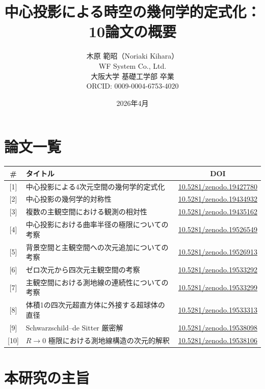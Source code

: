 \documentclass[12pt,a4paper]{ltjsarticle}
\title{中心投影による時空の幾何学的定式化：10論文の概要}
\author{木原 範昭（Noriaki Kihara）\\
WF System Co., Ltd.\\
大阪大学 基礎工学部 卒業\\
ORCID: 0009-0004-6753-4020}
\date{2026年4月}
\begin{document}
\maketitle

\section*{論文一覧}

\begin{table}[h]
\centering
\small
\begin{tabular}{clc}
\toprule
\# & タイトル & DOI \\
\midrule
{[1]} & 中心投影による4次元空間の幾何学的定式化 & \href{https://doi.org/10.5281/zenodo.19427780}{10.5281/zenodo.19427780} \\
{[2]} & 中心投影の幾何学的対称性 & \href{https://doi.org/10.5281/zenodo.19434932}{10.5281/zenodo.19434932} \\
{[3]} & 複数の主観空間における観測の相対性 & \href{https://doi.org/10.5281/zenodo.19435162}{10.5281/zenodo.19435162} \\
{[4]} & 中心投影における曲率半径の極限についての考察 & \href{https://doi.org/10.5281/zenodo.19526549}{10.5281/zenodo.19526549} \\
{[5]} & 背景空間と主観空間への次元追加についての考察 & \href{https://doi.org/10.5281/zenodo.19526913}{10.5281/zenodo.19526913} \\
{[6]} & ゼロ次元から四次元主観空間の考察 & \href{https://doi.org/10.5281/zenodo.19533292}{10.5281/zenodo.19533292} \\
{[7]} & 主観空間における測地線の連続性についての考察 & \href{https://doi.org/10.5281/zenodo.19533299}{10.5281/zenodo.19533299} \\
{[8]} & 体積1の四次元超直方体に外接する超球体の直径 & \href{https://doi.org/10.5281/zenodo.19533313}{10.5281/zenodo.19533313} \\
{[9]} & Schwarzschild--de Sitter 厳密解 & \href{https://doi.org/10.5281/zenodo.19538098}{10.5281/zenodo.19538098} \\
{[10]} & $R \to 0$ 極限における測地線構造の次元的解釈 & \href{https://doi.org/10.5281/zenodo.19538106}{10.5281/zenodo.19538106} \\
\bottomrule
\end{tabular}
\end{table}

\section*{本研究の主旨}
\end{document}
